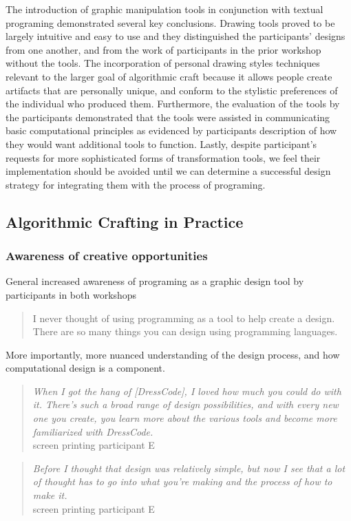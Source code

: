 \documentclass{sigchi}
\begin{document}
The introduction of graphic manipulation tools in conjunction with textual programing demonstrated several key conclusions. Drawing tools proved to be largely intuitive and easy to use and they distinguished the participants' designs from one another, and from the work of participants in the prior workshop without the tools. The incorporation of personal drawing styles techniques relevant to the larger goal of algorithmic craft because it allows people create artifacts that are personally unique, and conform to the stylistic preferences of the individual who produced them. Furthermore, the evaluation of the tools by the participants demonstrated that the tools were assisted in communicating basic computational principles as evidenced by participants description of how they would want additional tools to function. Lastly, despite participant's requests for more sophisticated forms of transformation tools, we feel their implementation should be avoided until we can determine a successful design strategy for integrating them with the process of programing. 

\subsection{Algorithmic Crafting in Practice}
\subsubsection{Awareness of creative opportunities}
General increased awareness of programing as a graphic design tool by participants in both workshops
\begin{quotation}
	I never thought of using programming as a tool to help create a design. There are so many things you can design using programming languages.
\end{quotation}

More importantly, more nuanced understanding of the design process, and how computational design is a component.
\begin{quotation}
	\textit{When I got the hang of [DressCode], I loved how much you could do with it. There's such a broad range of design possibilities, and with every new one you create, you learn more about the various tools and become more familiarized with DressCode.}
	\\screen printing participant E
\end{quotation}

\begin{quotation}
	\textit{Before I thought that design was relatively simple, but now I see that a lot of thought has to go into what you're making and the process of how to make it.}
		\\screen printing participant E
	\end{quotation}
\end{document}
